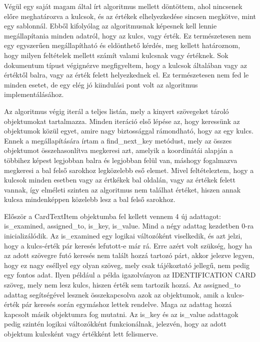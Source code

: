 \documentclass[12pt]{report}
\begin{document}
Végül egy saját magam által írt algoritmus mellett döntöttem, ahol nincsenek előre meghatározva a kulcsok, és az értékek elhelyezkedése sincsen megkötve, mint egy sablonnál. Ebből kifolyólag az algoritmusnak képesnek kell lennie megállapítania minden adatról, hogy az kulcs, vagy érték. Ez természetesen nem egy egyszerűen megállapítható és eldönthető kérdés, meg kellett határoznom, hogy milyen feltételek mellett számít valami kulcsnak vagy értéknek. Sok dokumentum típust végignézve megfigyeltem, hogy a kulcsok általában vagy az értéktől balra, vagy az érték felett helyezkednek el. Ez természetesen nem fed le minden esetet, de egy elég jó kiindulási pont volt az algoritmus implementálásához. 

Az algoritmus végig iterál a teljes listán, mely a kinyert szövegeket tároló objektumokat tartalmazza. Minden iteráció első lépése az, hogy keressünk az objektumok közül egyet, amire nagy biztossággal rámondható, hogy az egy kulcs. Ennek a megállapítására írtam a find\_next\_key metódust, mely az összes objektumot összehasonlítva megkeresi azt, amelyik a koordinátái alapján a többihez képest legjobban balra és legjobban felül van, máshogy fogalmazva megkeresi a bal felső sarokhoz legközelebb eső elemet. Mivel feltételeztem, hogy a kulcsok minden esetben vagy az értkékek bal oldalán, vagy az értékek felett vannak, így elméleti szinten az algoritmus nem találhat értéket, hiszen annak kulcsa mindenképpen közelebb lesz a bal felső sarokhoz.

Először a CardTextItem objektumba fel kellett vennem 4 új adattagot: is\_examined, assigned\_to, is\_key, is\_value. Mind a négy adattag kezdetben 0-ra inicializálódik. Az is\_examined egy logikai változóként viselkedik, és azt jelzi, hogy a kulcs-érték pár keresés lefutott-e már rá. Erre azért volt szükség, hogy ha az adott szövegre futó keresés nem talált hozzá tartozó párt, akkor jelezve legyen, hogy ez nagy eséllyel egy olyan szöveg, mely csak tájékoztató jellegű, nem pedig egy fontos adat. Ilyen például a példa igazolványon az IDENTIFICATION CARD szöveg, mely nem lesz kulcs, hiszen érték sem tartozik hozzá.
Az assigned\_to adattag segítségével lesznek összekapcsolva azok az objektumok, amik a kulcs-érték pár keresés során egymáshoz lettek rendelve. Maga az adattag hozzá kapcsolt másik objektumra fog mutatni. Az is\_key és az is\_value adattagok pedig szintén logikai változókként funkcionálnak, jelezvén, hogy az adott objektum kulcsként vagy értékként lett felismerve.

\newpage
\end{document}

